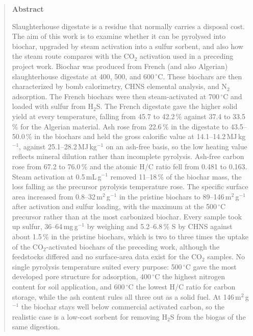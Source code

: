 \begin{abstract}

\begin{center}
\normalsize \textbf{Abstract}\\
\end{center}

\noindent
Slaughterhouse digestate is a residue that normally carries a disposal cost. The aim of this work is to examine whether it can be pyrolysed into biochar, upgraded by steam activation into a sulfur sorbent, and also how the steam route compares with the CO$_2$ activation used in a preceding project work. Biochar was produced from French (and also Algerian) slaughterhouse digestate at 400, 500, and 600\,$^{\circ}$C. These biochars are then characterized by bomb calorimetry, CHNS elemental analysis, and N$_2$ adsorption. The French biochars were then steam-activated at 700\,$^{\circ}$C and loaded with sulfur from H$_2$S. The French digestate gave the higher solid yield at every temperature, falling from 45.7 to 42.2\,\% against 37.4 to 33.5\,\% for the Algerian material. Ash rose from 22.6\,\% in the digestate to 43.5--50.0\,\% in the biochars and held the gross calorific value at 14.1--14.2\,MJ\,kg$^{-1}$, against 25.1--28.2\,MJ\,kg$^{-1}$ on an ash-free basis, so the low heating value reflects mineral dilution rather than incomplete pyrolysis. Ash-free carbon rose from 67.2 to 76.0\,\% and the atomic H/C ratio fell from 0.481 to 0.163. Steam activation at 0.5\,mL\,g$^{-1}$ removed 11--18\,\% of the biochar mass, the loss falling as the precursor pyrolysis temperature rose. The specific surface area increased from 0.8--32\,m$^2$\,g$^{-1}$ in the pristine biochars to 89--146\,m$^2$\,g$^{-1}$ after activation and sulfur loading, with the maximum at the 500\,$^{\circ}$C precursor rather than at the most carbonized biochar. Every sample took up sulfur, 36--64\,mg\,g$^{-1}$ by weighing and 5.2--6.8\,\% S by CHNS against about 1.5\,\% in the pristine biochars, which is two to three times the uptake of the CO$_2$-activated biochars of the preceding work, although the feedstocks differed and no surface-area data exist for the CO$_2$ samples. No single pyrolysis temperature suited every purpose: 500\,$^{\circ}$C gave the most developed pore structure for adsorption, 400\,$^{\circ}$C the highest nitrogen content for soil application, and 600\,$^{\circ}$C the lowest H/C ratio for carbon storage, while the ash content rules all three out as a solid fuel. At 146\,m$^2$\,g$^{-1}$ the biochar stays well below commercial activated carbon, so the realistic case is a low-cost sorbent for removing H$_2$S from the biogas of the same digestion.
\noindent

\end{abstract}


\vspace{0.5em}

\noindent

\vspace{0.8em}

